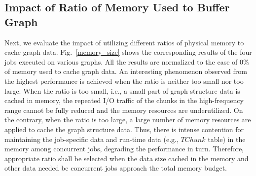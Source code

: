 \documentclass[10pt,journal,compsoc]{IEEEtran}
\begin{document}
\subsection{Impact of Ratio of Memory Used to Buffer Graph}
\vspace{-2pt}
Next, we evaluate the impact of utilizing different ratios of physical memory to cache graph data. Fig.~\ref{memory_size} shows the corresponding results of the four jobs executed on various graphs. All the results are normalized to the case of 0\% of memory used to cache graph data.
An interesting phenomenon observed from the highest performance is achieved when the ratio is neither too small nor too large.
When the ratio is too small, i.e., a small part of graph structure data is cached in memory, the repeated I/O traffic of the chunks in the high-frequency range cannot be fully reduced and the memory resources are underutilized. On the contrary, when the ratio is too large,  a large number of memory resources are applied to cache the graph structure data. Thus, there is intense contention for maintaining the job-specific data and run-time data (e.g., $TChunk$ table) in the memory among concurrent jobs, degrading the performance in turn. Therefore, appropriate ratio shall be selected when the data size cached in the memory and other data needed be concurrent jobs approach the total memory budget.
\end{document}
